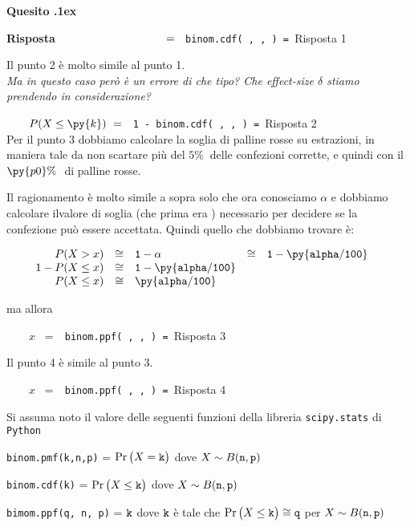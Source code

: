 \documentclass[11pt,twoside,a4paper]{article}
\newcounter{quesito}
\newenvironment{question}{\addtocounter{quesito}{1}\par\textbf{Quesito \thequesito.\kern1ex}}{\vspace{0.5\parskip}}
\newenvironment{answer}{\par\textbf{Risposta\quad}}{\vspace{\parskip}}
\begin{document}
\begin{question}
\begin{answer}
$\qquad\displaystyle
\phantom{P(X\le \py{k})}
\ =\ ${\tt {\color{blue} binom.cdf( , ,  )} = }\hfill  {\color{blue}Risposta 1}

\bigskip
Il punto 2 è molto simile al punto 1.\\ \emph{Ma in questo caso però è un errore di che tipo? Che effect-size $\delta$ stiamo prendendo in considerazione?}

\smallskip
$\qquad P(X\le \py{k})\ =\ ${\tt {\color{blue} 1 - binom.cdf( , ,  )} = }\hfill  {\color{blue}Risposta 2} \\

Per il punto 3 dobbiamo calcolare la soglia di palline rosse su  estrazioni, in maniera tale da non scartare più del $5\% \ $ delle confezioni corrette, e quindi con il $\py{p0}\%\ $ di palline rosse.

Il ragionamento è molto simile a sopra solo che ora conosciamo $\alpha$ e dobbiamo calcolare ilvalore di soglia (che prima era ) necessario per decidere se la confezione può essere accettata. Quindi quello che dobbiamo trovare è:

$\qquad\begin{array}{rclcl}
P(X > x )&\cong&{\tt 1-\alpha} &\cong&{\tt 1-\py{alpha/100}}\\
1-P(X \le x )&\cong&{\tt 1-\py{alpha/100}}\\
P(X \le x )&\cong&{\tt \py{alpha/100}}
\end{array}$

ma allora 

$\displaystyle\qquad
x$
\ =\ {\tt {\color{blue} binom.ppf( , ,  )} = }\hfill  {\color{blue}Risposta 3}

\bigskip
Il punto 4 è simile al punto 3.

$\displaystyle\qquad
x$
\ =\ {\tt {\color{blue} binom.ppf( , ,  )} = }\hfill {\color{blue}Risposta 4}







\end{answer}
\end{question}



\vfill
\hrulefill

Si assuma noto il valore delle seguenti funzioni della libreria {\tt scipy.stats\/} di  {\tt Python\/}

{\tt binom.pmf(k,n,p)} = $\Pr\big(X={\tt k}\big)$ dove $X\sim B({\tt n},{\tt p})$ 

{\tt binom.cdf(k)} = $\Pr\big(X\le{\tt k}\big)$ dove  $X\sim B({\tt n},{\tt p})$ 

{\tt bimom.ppf(q, n, p)} = ${\tt k}$ dove ${\tt k}$ è tale che $\Pr\big(X\le{\tt k}\big)\cong{\tt q}$ per $X\sim B({\tt n},{\tt p})$ 
\end{document}
